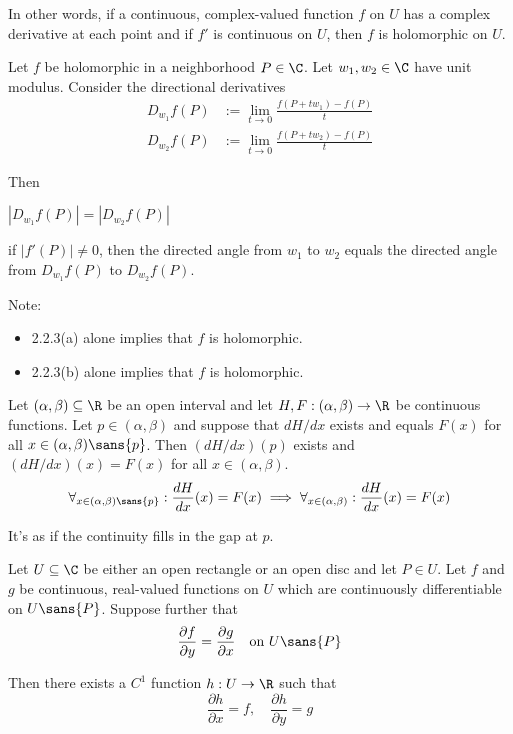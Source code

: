 In other words, if a continuous, complex-valued function $f$ on $U$ has a
complex derivative at each point and if $f'$ is continuous on $U$, then $f$ is
holomorphic on $U$.

\label{c41052e}

Let $f$ be holomorphic in a neighborhood $P\in\C$. Let $w_1,w_2\in\C$ have unit
modulus. Consider the directional derivatives
\begin{align*}
  D_{w_1}f(P) &:=\lim_{t\to0}\frac{f(P+tw_1)-f(P)}t \\
  D_{w_2}f(P) &:=\lim_{t\to0}\frac{f(P+tw_2)-f(P)}t
\end{align*}

Then
\begin{enumerata}
  \item $|D_{w_1}f(P)|=|D_{w_2}f(P)|$
  \item if $|f'(P)|\neq0$, then the directed angle from $w_1$ to $w_2$ equals the
  directed angle from $D_{w_1}f(P)$ to $D_{w_2}f(P)$.
\end{enumerata}

Note:
\begin{itemize}
  \item 2.2.3(a) alone implies that $f$ is holomorphic.
  \item 2.2.3(b) alone implies that $f$ is holomorphic.
\end{itemize}

\label{f8abd8b}

Let $(\alpha,\beta)\subseteq\R$ be an open interval and let
$H,F:(\alpha,\beta)\to\R$ be continuous functions. Let $p\in(\alpha,\beta)$ and
suppose that $dH/dx$ exists and equals $F(x)$ for all
$x\in(\alpha,\beta)\sans{p}$. Then $(dH/dx)(p)$ exists and $(dH/dx)(x)=F(x)$
for all $x\in(\alpha,\beta)$.
$$
  \forall_{x\in(\alpha,\beta)\sans{p}}:\frac{dH}{dx}(x)=F(x)\implies
  \forall_{x\in(\alpha,\beta)}:\frac{dH}{dx}(x)=F(x)
$$

It's as if the continuity fills in the gap at $p$.

\label{f017dd0}

Let $U\subseteq\C$ be either an open rectangle or an open disc and let $P\in
U$. Let $f$ and $g$ be continuous, real-valued functions on $U$ which are
continuously differentiable on $U\sans{P}$. Suppose further that
$$
  \frac{\partial f}{\partial y}=\frac{\partial g}{\partial x}
  \quad\text{on }U\sans{P}
$$

Then there exists a $C^1$ function $h:U\to\R$ such that
$$
  \frac{\partial h}{\partial x}=f,\quad
  \frac{\partial h}{\partial y}=g
$$

